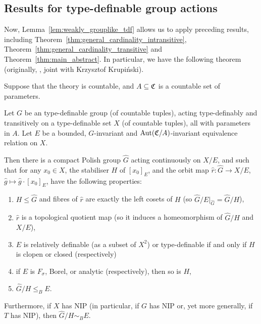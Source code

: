 	\subsection*{Results for type-definable group actions}
	
	Now, Lemma~\ref{lem:weakly_grouplike_tdf} allows us to apply preceding results, including Theorem~\ref{thm:general_cardinality_intransitive}, Theorem~\ref{thm:general_cardinality_transitive} and Theorem~\ref{thm:main_abstract}. In particular, we have the following theorem (originally, \cite[Theorem 8.4]{KR18}, joint with Krzysztof Krupiński).
	
	
	
	\begin{thm}
		\label{thm:main_tdf}
		Suppose that the theory is countable, and $A\subseteq {\mathfrak C}$ is a countable set of parameters.
		
		Let $G$ be an type-definable group (of countable tuples), acting type-definably and transitively on a type-definable set $X$ (of countable tuples), all with parameters in $A$. Let $E$ be a bounded, $G$-invariant and $\operatorname{{Aut}}({\mathfrak C}/A)$-invariant equivalence relation on $X$.
		
		Then there is a compact Polish group $\hat G$ acting continuously on $X/E$, and such that for any $x_0\in X$, the stabiliser $H$ of $[x_0]_E$, and the orbit map $\hat r\colon \hat G\to X/E$, $\hat g\mapsto \hat g\cdot [x_0]_E$, have the following properties:
		\begin{enumerate}
			\item
			$H\leq \hat G$ and fibres of $\hat r$ are exactly the left cosets of $H$ (so $\hat G/E|_{\hat G}=\hat G/H$),
			\item
			$\hat r$ is a topological quotient map (so it induces a homeomorphism of $\hat G/H$ and $X/E$),
			\item
			$E$ is relatively definable (as a subset of $X^2$) or type-definable if and only if $H$ is clopen or closed (respectively)
			\item
			if $E$ is $F_\sigma$, Borel, or analytic (respectively), then so is $H$,
			\item
			$\hat G/H\leq_B E$.
		\end{enumerate}
		Furthermore, if $X$ has NIP (in particular, if $G$ has NIP or, yet more generally, if $T$ has NIP), then $\hat G/H\sim_B E$.
	\end{thm}

